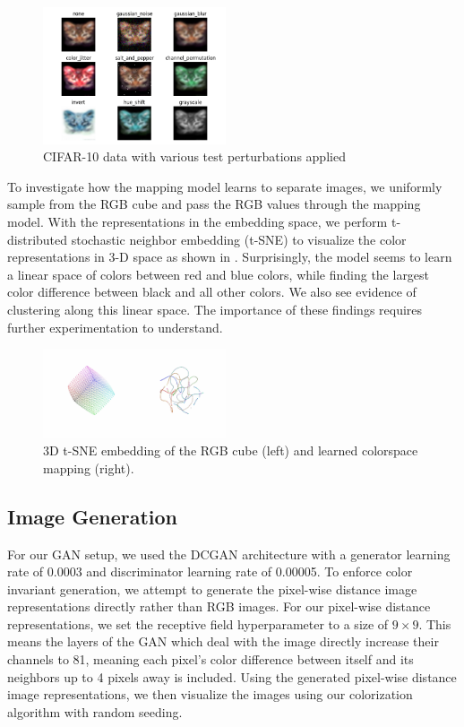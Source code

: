 \documentclass[10pt,twocolumn,letterpaper]{article}
\begin{document}
\begin{figure}[h!]
    \centering
    \includegraphics[width=0.48\textwidth]{images/cifar10_perturbations.png}
    \caption{CIFAR-10 data with various test perturbations applied}
    \label{cifar_perturbations}
\end{figure}

To investigate how the mapping model learns to separate images, we uniformly sample from the RGB cube and pass the RGB values through the mapping model. With the representations in the embedding space, we perform t-distributed stochastic neighbor embedding (t-SNE) to visualize the color representations in 3-D space as shown in . Surprisingly, the model seems to learn a linear space of colors between red and blue colors, while finding the largest color difference between black and all other colors. We also see evidence of clustering along this linear space. The importance of these findings requires further experimentation to understand.

\begin{figure}[h!]
    \centering
    \includegraphics[width=0.48\textwidth]{images/embedding.png}
    \caption{3D t-SNE embedding of the RGB cube (left) and learned colorspace mapping (right).}
    \label{3d_embedding}
\end{figure}

\subsection{Image Generation}
For our GAN setup, we used the DCGAN architecture \cite{radford} with a generator learning rate of 0.0003 and discriminator learning rate of 0.00005. To enforce color invariant generation, we attempt to generate the pixel-wise distance image representations directly rather than RGB images. For our pixel-wise distance representations, we set the receptive field hyperparameter to a size of $9\times9$. This means the layers of the GAN which deal with the image directly increase their channels to 81, meaning each pixel's color difference between itself and its neighbors up to 4 pixels away is included. Using the generated pixel-wise distance image representations, we then visualize the images using our colorization algorithm with random seeding.
\end{document}
